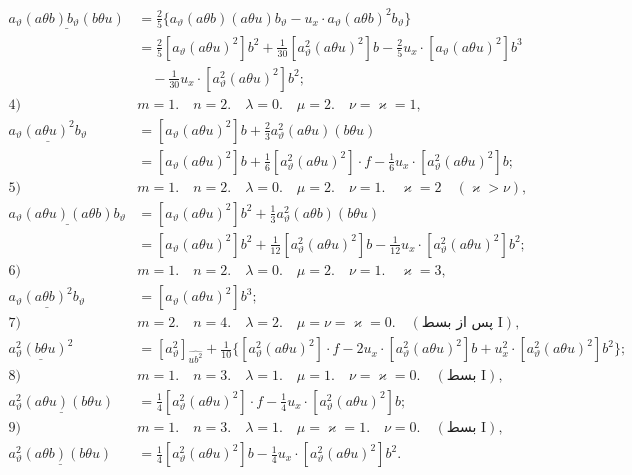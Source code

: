 \documentclass[11pt]{article}
\begin{document}
\[
\begin{aligned}
\underline{a_\vartheta(a\theta b)b_\vartheta(b\theta u)}
&=\frac25\{a_\vartheta(a\theta b)(a\theta u)b_\vartheta-u_x\cdot a_\vartheta(a\theta b)^2b_\vartheta\}\\
&=\frac25[a_\vartheta(a\theta u)^2]b^2+\frac1{30}[a_\vartheta^2(a\theta u)^2]b-\frac25u_x\cdot[a_\vartheta(a\theta u)^2]b^3\\
&\quad-\frac1{30}u_x\cdot[a_\vartheta^2(a\theta u)^2]b^2;\\[0.7em]
\text{4)}\quad&m=1.\quad n=2.\quad \lambda=0.\quad \mu=2.\quad \nu=\varkappa=1,\\[0.25em]
\underline{a_\vartheta(a\theta u)^2b_\vartheta}
&=[a_\vartheta(a\theta u)^2]b+\frac23a_\vartheta^2(a\theta u)(b\theta u)\\
&=[a_\vartheta(a\theta u)^2]b+\frac16[a_\vartheta^2(a\theta u)^2]\cdot f-\frac16u_x\cdot[a_\vartheta^2(a\theta u)^2]b;\\[0.7em]
\text{5)}\quad&m=1.\quad n=2.\quad \lambda=0.\quad \mu=2.\quad \nu=1.\quad \varkappa=2\quad(\varkappa>\nu),\\[0.25em]
\underline{a_\vartheta(a\theta u)(a\theta b)b_\vartheta}
&=[a_\vartheta(a\theta u)^2]b^2+\frac13a_\vartheta^2(a\theta b)(b\theta u)\\
&=[a_\vartheta(a\theta u)^2]b^2+\frac1{12}[a_\vartheta^2(a\theta u)^2]b-\frac1{12}u_x\cdot[a_\vartheta^2(a\theta u)^2]b^2;\\[0.7em]
\text{6)}\quad&m=1.\quad n=2.\quad \lambda=0.\quad \mu=2.\quad \nu=1.\quad \varkappa=3,\\[0.25em]
\underline{a_\vartheta(a\theta b)^2b_\vartheta}&=[a_\vartheta(a\theta u)^2]b^3;\\[0.7em]
\text{7)}\quad&m=2.\quad n=4.\quad \lambda=2.\quad \mu=\nu=\varkappa=0.\quad(\text{پس از بسط I}),\\[0.25em]
\underline{a_\vartheta^2(b\theta u)^2}&=[a_\vartheta^2]_{\widehat{ub^2}}+\frac1{10}\{[a_\vartheta^2(a\theta u)^2]\cdot f-2u_x\cdot[a_\vartheta^2(a\theta u)^2]b+u_x^2\cdot[a_\vartheta^2(a\theta u)^2]b^2\};\\[0.7em]
\text{8)}\quad&m=1.\quad n=3.\quad \lambda=1.\quad \mu=1.\quad \nu=\varkappa=0.\quad(\text{بسط I}),\\[0.25em]
\underline{a_\vartheta^2(a\theta u)(b\theta u)}&=\frac14[a_\vartheta^2(a\theta u)^2]\cdot f-\frac14u_x\cdot[a_\vartheta^2(a\theta u)^2]b;\\[0.7em]
\text{9)}\quad&m=1.\quad n=3.\quad \lambda=1.\quad \mu=\varkappa=1.\quad \nu=0.\quad(\text{بسط I}),\\[0.25em]
\underline{a_\vartheta^2(a\theta b)(b\theta u)}&=\frac14[a_\vartheta^2(a\theta u)^2]b-\frac14u_x\cdot[a_\vartheta^2(a\theta u)^2]b^2.
\end{aligned}
\]
\end{document}
